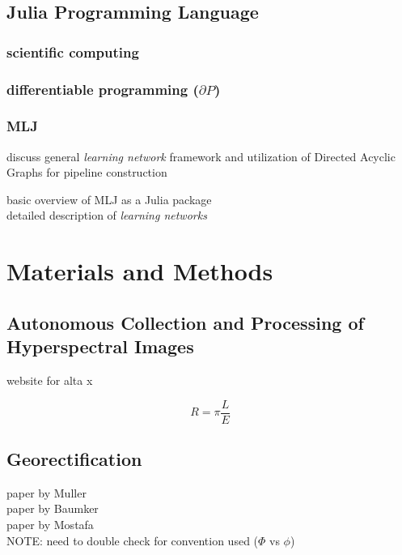 \subsection{Julia Programming Language}
\subsubsection{scientific computing}
\subsubsection{differentiable programming ($\partial P$)}
\subsubsection{MLJ}
discuss general \textit{learning network} framework and utilization of
Directed Acyclic Graphs for pipeline construction

basic overview of MLJ as a Julia package \cite{MLJ1}\\ 

detailed description of \textit{learning networks} \cite{MLJ2}



\section{Materials and Methods}
\subsection{Autonomous Collection and Processing of Hyperspectral Images}

website for alta x \cite{freeflyAltaX}

\begin{equation}
  R = \pi \frac{L}{E}
\end{equation}



\subsection{Georectification}
paper by Muller \cite{muller-georeferencing} \\
paper by Baumker \cite{GeorectificationBaumker} \\
paper by Mostafa \cite{GeorectificationMostafa} \\



NOTE: need to double check \cite{muller-georeferencing} for convention used ($\Phi$ vs $\phi$)


